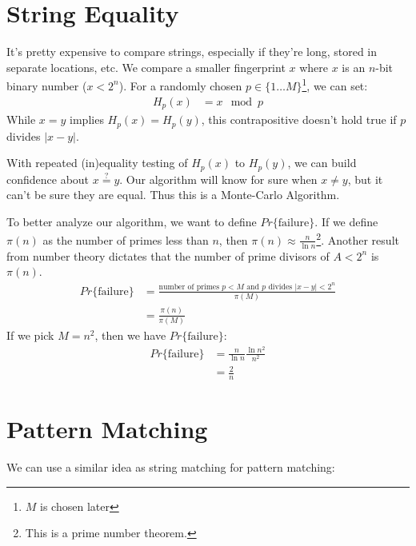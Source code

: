             \section{String Equality} %
            \label{sec:string_equality}
                It's pretty expensive to compare strings, especially if they're long, stored in separate locations, etc.
                We compare a smaller fingerprint $x$ where $x$ is an $n$-bit binary number ($x < 2^n$).
                For a randomly chosen $p \in \{ 1 \ldots M \}$\footnote{$M$ is chosen later}, we can set:
                \begin{align*}
                    H_p (x) &= x \mod p
                \end{align*}
                While $x = y$ implies $H_p(x) = H_p(y)$, this contrapositive doesn't hold true if $p$ divides $|x - y|$.

                With repeated (in)equality testing of $H_p(x)$ to $H_p(y)$, we can build confidence about $x \stackrel{?}{=} y$.
                Our algorithm will know for sure when $x \ne y$, but it can't be sure they are equal.
                Thus this is a Monte-Carlo Algorithm.

                To better analyze our algorithm, we want to define $Pr\{\text{failure}\}$.
                If we define $\pi(n)$ as the number of primes less than $n$, then $\pi(n) \approx \frac{n}{\ln n}$\footnote{This is a prime number theorem.}.
                Another result from number theory dictates that the number of prime divisors of $A < 2^n$ is $\pi(n)$.
                \begin{align*}
                    Pr\{\text{failure}\} &= \frac{\text{number of primes $p < M$ and $p$ divides $|x-y| < 2^n$}}{\pi(M)} \\
                    &= \frac{\pi(n)}{\pi(M)}
                \end{align*}
                If we pick $M = n^2$, then we have $Pr\{\text{failure}\}$:
                \begin{align*}
                    Pr\{\text{failure}\} &= \frac{n}{\ln n} \frac{\ln n^2}{n^2} \\
                    &= \frac{2}{n}
                \end{align*}
            \section{Pattern Matching} %
            \label{sec:pattern_matching}
                We can use a similar idea as string matching for pattern matching:

